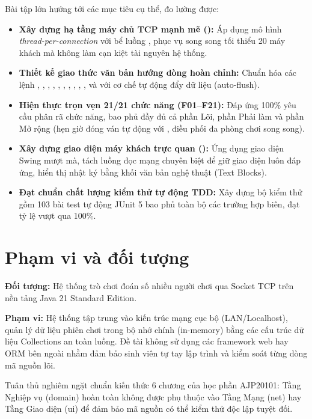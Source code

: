 Bài tập lớn hướng tới các mục tiêu cụ thể, đo lường được:
\begin{itemize}[leftmargin=1.6em, itemsep=2pt]
  \item \textbf{Xây dựng hạ tầng máy chủ TCP mạnh mẽ ():} Áp
        dụng mô hình \textit{thread-per-connection} với bể luồng
        , phục vụ song song tối thiểu 20 máy khách mà
        không làm cạn kiệt tài nguyên hệ thống.
  \item \textbf{Thiết kế giao thức văn bản hướng dòng hoàn chỉnh:} Chuẩn hóa
        các lệnh , , , ,
        , , , ,
        , ,  và
         với cơ chế tự động đẩy dữ liệu (auto-flush).
  \item \textbf{Hiện thực trọn vẹn 21/21 chức năng (F01--F21):} Đáp ứng 100\%
        yêu cầu phân rã chức năng, bao phủ đầy đủ cả phần Lõi, phần Phải làm
        và phần Mở rộng (hẹn giờ đóng ván tự động với , điều phối
        đa phòng chơi song song).
  \item \textbf{Xây dựng giao diện máy khách trực quan ():}
        Ứng dụng giao diện Swing mượt mà, tách luồng đọc mạng chuyên biệt để
        giữ giao diện luôn đáp ứng, hiển thị nhật ký bằng khối văn bản nghệ
        thuật (Text Blocks).
  \item \textbf{Đạt chuẩn chất lượng kiểm thử tự động TDD:} Xây dựng bộ kiểm
        thử gồm 103 bài test tự động JUnit 5 bao phủ toàn bộ các trường hợp
        biên, đạt tỷ lệ vượt qua 100\%.
\end{itemize}

\section{Phạm vi và đối tượng}

\textbf{Đối tượng:} Hệ thống trò chơi đoán số nhiều người chơi qua Socket TCP
trên nền tảng Java 21 Standard Edition.

\textbf{Phạm vi:} Hệ thống tập trung vào kiến trúc mạng cục bộ
(LAN/Localhost), quản lý dữ liệu phiên chơi trong bộ nhớ chính (in-memory)
bằng các cấu trúc dữ liệu Collections an toàn luồng. Đề tài không sử dụng các
framework web hay ORM bên ngoài nhằm đảm bảo sinh viên tự tay lập trình và
kiểm soát từng dòng mã nguồn lõi.

\begin{luuy}
Tuân thủ nghiêm ngặt chuẩn kiến thức 6 chương của học phần AJP20101: Tầng
Nghiệp vụ (domain) hoàn toàn không được phụ thuộc vào Tầng Mạng (net) hay Tầng
Giao diện (ui) để đảm bảo mã nguồn có thể kiểm thử độc lập tuyệt đối.
\end{luuy}

